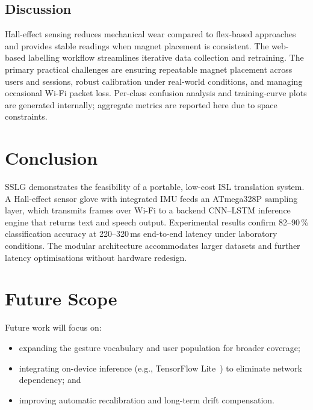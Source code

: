 \documentclass[conference]{IEEEtran}
\newcommand{\SystemAcronym}{SSLG }
\begin{document}
\subsection{Discussion}

Hall-effect sensing reduces mechanical wear compared to flex-based approaches
and provides stable readings when magnet placement is consistent. The
web-based labelling workflow streamlines iterative data collection and
retraining. The primary practical challenges are ensuring repeatable magnet
placement across users and sessions, robust calibration under real-world
conditions, and managing occasional Wi-Fi packet loss. Per-class confusion
analysis and training-curve plots are generated internally; aggregate metrics
are reported here due to space constraints.

\section{Conclusion}

\SystemAcronym demonstrates the feasibility of a portable, low-cost ISL
translation system. A Hall-effect sensor glove with integrated IMU feeds an
ATmega328P sampling layer, which transmits frames over Wi-Fi to a backend
CNN--LSTM inference engine that returns text and speech output. Experimental
results confirm 82--90\,\% classification accuracy at 220--320\,ms
end-to-end latency under laboratory conditions. The modular architecture
accommodates larger datasets and further latency optimisations without
hardware redesign.

\section{Future Scope}

Future work will focus on:
\begin{itemize}[noitemsep, topsep=2pt]
  \item expanding the gesture vocabulary and user population for broader coverage;
  \item integrating on-device inference (e.g., TensorFlow Lite~\cite{tensorflow})
        to eliminate network dependency; and
  \item improving automatic recalibration and long-term drift compensation.
\end{itemize}
\end{document}
